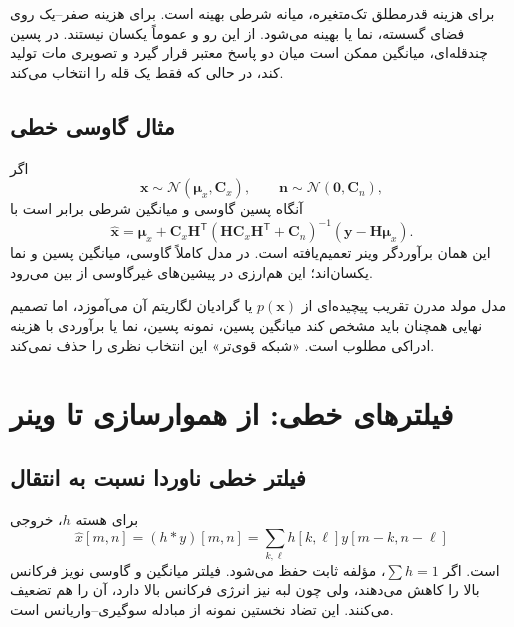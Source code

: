 \documentclass[12pt,openany,oneside]{book}
\newcommand{\trans}{^{\mathsf T}}
\newcommand{\vect}[1]{\bm{#1}}
\newcommand{\Normal}{\mathcal{N}}
\begin{document}
برای هزینه قدرمطلق تک‌متغیره، میانه شرطی بهینه است. برای هزینه صفر--یک روی فضای گسسته، نما یا  بهینه می‌شود.
از این رو  و  عموماً یکسان نیستند. در پسین چندقله‌ای، میانگین ممکن است میان دو پاسخ معتبر قرار گیرد و تصویری مات تولید کند،
در حالی که  فقط یک قله را انتخاب می‌کند.

\subsection{مثال گاوسی خطی}
اگر
\begin{equation}
\vect x\sim\Normal(\vect\mu_x,\vect C_x),\qquad
\vect n\sim\Normal(\mathbf{0},\vect C_n),
\end{equation}
آنگاه پسین گاوسی و میانگین شرطی برابر است با
\begin{equation}
\widehat{\vect x}
=\vect\mu_x+\vect C_x\vect H\trans
(\vect H\vect C_x\vect H\trans+\vect C_n)^{-1}
(\vect y-\vect H\vect\mu_x).
\label{eq:lmmse-general}
\end{equation}
این همان برآوردگر وینر تعمیم‌یافته است. در مدل کاملاً گاوسی، میانگین پسین و نما یکسان‌اند؛ این هم‌ارزی در پیشین‌های غیرگاوسی از بین می‌رود.

\begin{futurebox}
مدل مولد مدرن تقریب پیچیده‌ای از \(p(\vect x)\) یا گرادیان لگاریتم آن می‌آموزد، اما تصمیم نهایی همچنان باید مشخص کند
میانگین پسین، نمونه پسین، نما یا برآوردی با هزینه ادراکی مطلوب است. «شبکه قوی‌تر» این انتخاب نظری را حذف نمی‌کند.
\end{futurebox}

\section{فیلترهای خطی: از هموارسازی تا وینر}

\subsection{فیلتر خطی ناوردا نسبت به انتقال}

برای هسته \(h\)، خروجی
\begin{equation}
\widehat x[m,n]=(h*y)[m,n]
=\sum_{k,\ell}h[k,\ell]y[m-k,n-\ell]
\end{equation}
است. اگر \(\sum h=1\)، مؤلفه ثابت حفظ می‌شود. فیلتر میانگین و گاوسی نویز فرکانس بالا را کاهش می‌دهند،
ولی چون لبه نیز انرژی فرکانس بالا دارد، آن را هم تضعیف می‌کنند. این تضاد نخستین نمونه از مبادله سوگیری--واریانس است.
\end{document}
